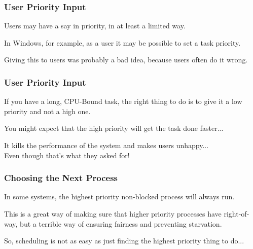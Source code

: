 \begin{frame}
\frametitle{User Priority Input}

Users may have a say in priority, in at least a limited way. 

In Windows, for example, as a user it may be possible to set a task priority. 

Giving this to users was probably a bad idea, because users often do it wrong. 


\end{frame}

\begin{frame}
\frametitle{User Priority Input}

If you have a long, CPU-Bound task, the right thing to do is to give it a low priority and not a high one. 

You might expect that the high priority will get the task done faster... 

It kills the performance of the system and makes users unhappy...\\
\quad Even though that's what they asked for!



\end{frame}

\begin{frame}
\frametitle{Choosing the Next Process}

In some systems, the highest priority non-blocked process will always run. 

This is a great way of making sure that higher priority processes have right-of-way, but a terrible way of ensuring fairness and preventing starvation. 

So, scheduling is not as easy as just finding the highest priority thing to do...

\end{frame}



